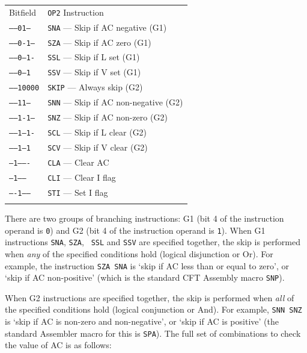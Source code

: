 \documentclass[11pt,a4paper,twocolumns]{article}
\newcommand\zebra{\rowcolors{2}{gray!10}{white}}
\newcommand\register[1]{\textsf{#1}}
\newcommand\A{\register{AC}}
\newcommand\Areg{\A}
\newcommand\Lreg{\register{L}}
\newcommand\Ireg{\register{I}}
\newcommand\Vreg{\register{V}}
\begin{document}
\vspace{1em}\noindent\begin{center}
\zebra
\begin{tabular}{ll}
  Bitfield & {\tt OP2} Instruction \\\noalign{\smallskip}\hline\noalign{\smallskip}
  {\tt -----01---} & {\tt SNA} — Skip if \A{} negative (G1)\\
  {\tt -----0-1--} & {\tt SZA} — Skip if \A{} zero (G1) \\
  {\tt -----0--1-} & {\tt SSL} — Skip if \Lreg{} set (G1) \\
  {\tt -----0---1} & {\tt SSV} — Skip if \Vreg{} set (G1) \\
  {\tt -----10000} & {\tt SKIP} — Always skip (G2) \\
  {\tt -----11---} & {\tt SNN} — Skip if \A{} non-negative (G2) \\
  {\tt -----1-1--} & {\tt SNZ} — Skip if \A{} non-zero (G2) \\
  {\tt -----1--1-} & {\tt SCL} — Skip if \Lreg{} clear (G2) \\
  {\tt -----1---1} & {\tt SCV} — Skip if \Vreg{} clear (G2) \\
  {\tt --1-------} & {\tt CLA} — Clear \A{} \\
  {\tt ---1------} & {\tt CLI} — Clear \Ireg{} flag \\
  {\tt ----1-----} & {\tt STI} — Set \Ireg{} flag \\%
  \noalign{\smallskip}\hline\noalign{\smallskip}
\end{tabular}
\end{center}\vspace{1em}

There are two groups of branching instructions: G1 (bit 4 of the
instruction operand is {\tt 0}) and G2 (bit 4 of the instruction
operand is {\tt 1}). When G1 instructions {\tt SNA}, {\tt SZA}, {\tt
  SSL} and {\tt SSV} are specified together, the skip is performed
when {\em any\/} of the specified conditions hold (logical disjunction
or Or). For example, the instruction {\tt SZA SNA} is ‘skip if \A{} less
than or equal to zero’, or ‘skip if \A{} non-positive’ (which is the
standard CFT Assembly macro {\tt SNP}).

When G2 instructions are specified together, the skip is performed
when {\em all\/} of the specified conditions hold (logical conjunction
or And). For example, {\tt SNN SNZ} is ‘skip if \A{} is non-zero and
non-negative’, or ‘skip if \A{} is positive’ (the standard Assembler
macro for this is {\tt SPA}). The full set of combinations to check
the value of \Areg{} is as follows:
\end{document}

